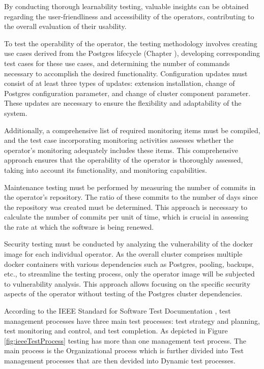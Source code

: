 By conducting thorough learnability testing, valuable insights can be obtained regarding the user-friendliness and accessibility of the operators, contributing to the overall evaluation of their usability.

To test the operability of the operator, the testing methodology involves creating use cases derived from the Postgres lifecycle (Chapter ), developing corresponding test cases for these use cases, and determining the number of commands necessary to accomplish the desired functionality.
Configuration updates must consist of at least three types of updates: extension installation, change of Postgres configuration parameter, and change of cluster component parameter. These updates are necessary to ensure the flexibility and adaptability of the system.

Additionally, a comprehensive list of required monitoring items must be compiled, and the test case incorporating monitoring activities assesses whether the operator's monitoring adequately includes these items. This comprehensive approach ensures that the operability of the operator is thoroughly assessed, taking into account its functionality, and monitoring capabilities.

Maintenance testing must be performed by measuring the number of commits in the operator's repository. The ratio of these commits to the number of days since the repository was created must be determined. This approach is necessary to calculate the number of commits per unit of time, which is crucial in assessing the rate at which the software is being renewed.

Security testing must be conducted by analyzing the vulnerability of the docker image for each individual operator. As the overall cluster comprises multiple docker containers with various dependencies such as Postgres, pooling, backups, etc., to streamline the testing process, only the operator image will be subjected to vulnerability analysis. This approach allows focusing on the specific security aspects of the operator without testing of the Postgres cluster dependencies.


According to the IEEE Standard for Software Test Documentation \cite{ieeeTestProcess}, test management processes have three main test processes: test strategy and planning, test monitoring and control, and test completion.
As depicted in Figure \ref{fig:ieeeTestProcess} testing has more than one management test process. The main process is the Organizational process which is further divided into Test management processes that are then devided into Dynamic test processes.

